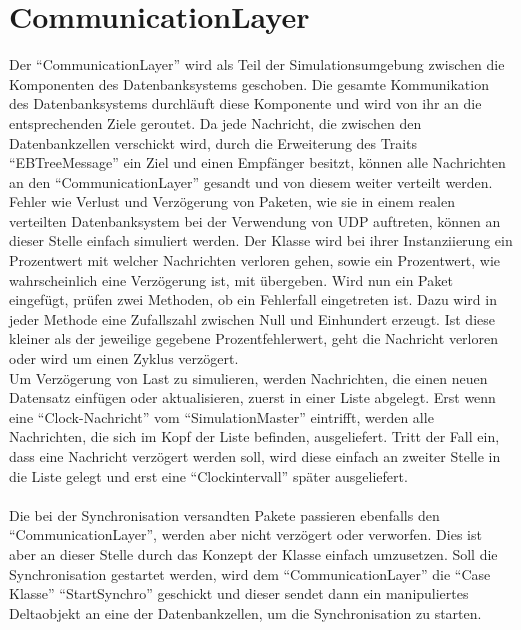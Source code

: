 \documentclass[a4paper,11pt,oneside,%
headsepline,												%
footsepline,												%
bibtotocnumbered									%
]{scrreprt}
\begin{document}
\section{CommunicationLayer}
Der \enquote{CommunicationLayer} wird als Teil der Simulationsumgebung zwischen die Komponenten des Datenbanksystems geschoben. Die gesamte Kommunikation des Datenbanksystems durchläuft diese Komponente und wird von ihr an die entsprechenden Ziele geroutet. Da jede Nachricht, die zwischen den Datenbankzellen verschickt wird, durch die Erweiterung des Traits \enquote{EBTreeMessage} ein Ziel und einen Empfänger besitzt, können alle Nachrichten an den \enquote{CommunicationLayer} gesandt und von diesem weiter verteilt werden. Fehler wie Verlust und Verzögerung von Paketen, wie sie in einem realen verteilten Datenbanksystem bei der Verwendung von UDP auftreten, können an dieser Stelle einfach simuliert werden. Der Klasse wird bei ihrer Instanziierung ein Prozentwert mit welcher Nachrichten verloren gehen, sowie ein Prozentwert, wie wahrscheinlich eine Verzögerung ist, mit übergeben. Wird nun ein Paket eingefügt, prüfen zwei Methoden, ob ein Fehlerfall eingetreten ist. Dazu wird in jeder Methode eine Zufallszahl zwischen Null und Einhundert erzeugt. Ist diese kleiner als der jeweilige gegebene Prozentfehlerwert, geht die Nachricht verloren oder wird um einen Zyklus verzögert.\\

Um Verzögerung von Last zu simulieren, werden Nachrichten, die einen neuen Datensatz einfügen oder aktualisieren, zuerst in einer Liste abgelegt. Erst wenn eine \enquote{Clock-Nachricht} vom \enquote{SimulationMaster} eintrifft, werden alle Nachrichten, die sich im Kopf der Liste befinden, ausgeliefert. Tritt der Fall ein, dass eine Nachricht verzögert werden soll, wird diese einfach an zweiter Stelle in die Liste gelegt und erst eine \enquote{Clockintervall} später ausgeliefert.\\\\
Die bei der Synchronisation versandten Pakete passieren ebenfalls den \enquote{CommunicationLayer}, werden aber nicht verzögert oder verworfen. Dies ist aber an dieser Stelle durch das Konzept der Klasse einfach umzusetzen. Soll die Synchronisation gestartet werden, wird dem \enquote{CommunicationLayer} die \enquote{Case Klasse} \enquote{StartSynchro} geschickt und dieser sendet dann ein manipuliertes Deltaobjekt an eine der Datenbankzellen, um die Synchronisation zu starten.
\end{document}
